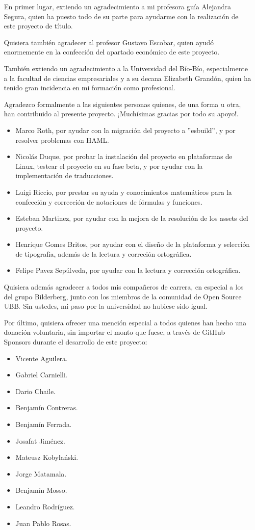 En primer lugar, extiendo un agradecimiento a mi profesora guía Alejandra Segura, quien ha puesto todo de su parte para ayudarme con la realización de este proyecto de título.

Quisiera también agradecer al profesor Gustavo Escobar, quien ayudó enormemente en la confección del apartado económico de este proyecto.

También extiendo un agradecimiento a la Universidad del Bío-Bío, especialmente a la facultad de ciencias empresariales y a su decana Elizabeth Grandón, quien ha tenido gran incidencia en mi formación como profesional.

Agradezco formalmente a las siguientes personas quienes, de una forma u otra, han contribuido al presente proyecto. ¡Muchísimas gracias por todo su apoyo!.

\begin{itemize}
	\item Marco Roth, por ayudar con la migración del proyecto a ''esbuild'', y por resolver problemas con HAML.
	\item Nicolás Duque, por probar la instalación del proyecto en plataformas de Linux, testear el proyecto en su fase beta, y por ayudar con la implementación de traducciones.
	\item Luigi Riccio, por prestar su ayuda y conocimientos matemáticos para la confección y corrección de notaciones de fórmulas y funciones. 
	\item Esteban Martinez, por ayudar con la mejora de la resolución de los assets del proyecto.
	\item Henrique Gomes Britos, por ayudar con el diseño de la plataforma y selección de tipografía, además de la lectura y correción ortográfica.
  \item Felipe Pavez Sepúlveda, por ayudar con la lectura y corrección ortográfica.
\end{itemize}

\pagebreak

Quisiera además agradecer a todos mis compañeros de carrera, en especial a los del grupo Bilderberg, junto con los miembros de la comunidad de Open Source UBB. Sin ustedes, mi paso por la universidad no hubiese sido igual.

Por último, quisiera ofrecer una mención especial a todos quienes han hecho una donación voluntaria, sin importar el monto que fuese, a través de GitHub Sponsors durante el desarrollo de este proyecto:
\begin{itemize}
  \item Vicente Aguilera.
  \item Gabriel Carnielli.
  \item Dario Chaile.
  \item Benjamín Contreras.
  \item Benjamín Ferrada.
  \item Josafat Jiménez.
  \item Mateusz Kobylański.
  \item Jorge Matamala.
  \item Benjamín Mosso.
  \item Leandro Rodríguez.
  \item Juan Pablo Rosas.
\end{itemize}
